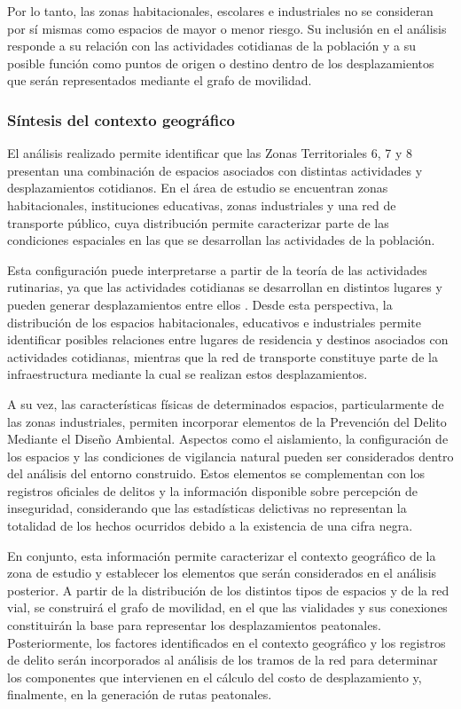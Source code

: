 Por lo tanto, las zonas habitacionales, escolares e industriales no se consideran por sí mismas como espacios de mayor o menor riesgo. Su inclusión en el análisis responde a su relación con las actividades cotidianas de la población y a su posible función como puntos de origen o destino dentro de los desplazamientos que serán representados mediante el grafo de movilidad.


\subsubsection{Síntesis del contexto geográfico}

El análisis realizado permite identificar que las Zonas Territoriales 6, 7 y 8 presentan una combinación de espacios asociados con distintas actividades y desplazamientos cotidianos. En el área de estudio se encuentran zonas habitacionales, instituciones educativas, zonas industriales y una red de transporte público, cuya distribución permite caracterizar parte de las condiciones espaciales en las que se desarrollan las actividades de la población.

Esta configuración puede interpretarse a partir de la teoría de las actividades rutinarias, ya que las actividades cotidianas se desarrollan en distintos lugares y pueden generar desplazamientos entre ellos \cite{cohenfelson1979}. Desde esta perspectiva, la distribución de los espacios habitacionales, educativos e industriales permite identificar posibles relaciones entre lugares de residencia y destinos asociados con actividades cotidianas, mientras que la red de transporte constituye parte de la infraestructura mediante la cual se realizan estos desplazamientos.

A su vez, las características físicas de determinados espacios, particularmente de las zonas industriales, permiten incorporar elementos de la Prevención del Delito Mediante el Diseño Ambiental. Aspectos como el aislamiento, la configuración de los espacios y las condiciones de vigilancia natural pueden ser considerados dentro del análisis del entorno construido. Estos elementos se complementan con los registros oficiales de delitos y la información disponible sobre percepción de inseguridad, considerando que las estadísticas delictivas no representan la totalidad de los hechos ocurridos debido a la existencia de una cifra negra.

En conjunto, esta información permite caracterizar el contexto geográfico de la zona de estudio y establecer los elementos que serán considerados en el análisis posterior. A partir de la distribución de los distintos tipos de espacios y de la red vial, se construirá el grafo de movilidad, en el que las vialidades y sus conexiones constituirán la base para representar los desplazamientos peatonales. Posteriormente, los factores identificados en el contexto geográfico y los registros de delito serán incorporados al análisis de los tramos de la red para determinar los componentes que intervienen en el cálculo del costo de desplazamiento y, finalmente, en la generación de rutas peatonales.
